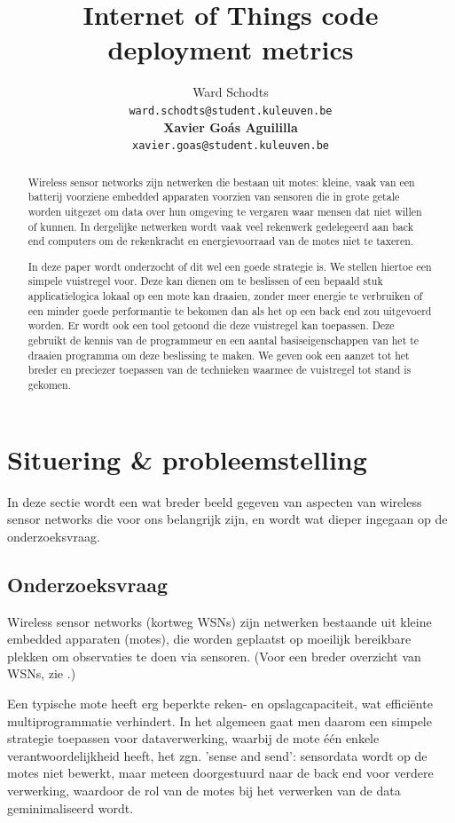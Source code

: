 \documentclass[11pt]{article}
\title{Internet of Things code deployment metrics}
\author{
  Ward Schodts\\
  \texttt{ward.schodts@student.kuleuven.be}
  \\[3ex]
  \textbf{Xavier Go\'as Aguililla}\\
  \texttt{xavier.goas@student.kuleuven.be}
}
\begin{document}
\maketitle

\listoftodos
\begin{abstract}
Wireless sensor networks zijn netwerken die bestaan uit motes: kleine, vaak van
een batterij voorziene embedded apparaten voorzien van sensoren die in grote
getale worden uitgezet om data over hun omgeving te vergaren waar mensen dat
niet willen of kunnen. In dergelijke netwerken wordt vaak veel rekenwerk
gedelegeerd aan back end computers om de rekenkracht en energievoorraad van de
motes niet te taxeren. 

In deze paper wordt onderzocht of dit wel een goede strategie is. We stellen
hiertoe een simpele vuistregel voor. Deze kan dienen om te beslissen of een
bepaald stuk applicatielogica lokaal op een mote kan draaien, zonder meer
energie te verbruiken of een minder goede performantie te bekomen dan als het op een
back end zou uitgevoerd worden. Er wordt ook een tool getoond die deze vuistregel
kan toepassen. Deze gebruikt de kennis van de programmeur en een aantal
basiseigenschappen van het te draaien programma om deze beslissing te maken. We
geven ook een aanzet tot het breder en preciezer toepassen van de technieken
waarmee de vuistregel tot stand is gekomen.
  
\end{abstract}

\section{Situering \& probleemstelling}

In deze sectie wordt een wat breder beeld gegeven van aspecten van wireless
sensor networks die voor ons belangrijk zijn, en wordt wat dieper ingegaan op de
onderzoeksvraag.

\subsection{Onderzoeksvraag}

Wireless sensor networks (kortweg WSNs) zijn netwerken bestaande uit kleine
embedded apparaten (motes), die worden geplaatst op moeilijk bereikbare plekken
om observaties te doen via sensoren. (Voor een breder overzicht van
WSNs, zie \cite{akyildiz2002wireless}.)

Een typische mote heeft erg beperkte reken- en opslagcapaciteit, wat
effici\"ente multiprogrammatie verhindert. In het algemeen gaat men daarom een
simpele strategie toepassen voor dataverwerking, waarbij de mote \'e\'en enkele
verantwoordelijkheid heeft, het zgn. 'sense and send': sensordata wordt op de
motes niet bewerkt, maar meteen doorgestuurd naar de back end voor verdere
verwerking, waardoor de rol van de motes bij het verwerken van de data
geminimaliseerd wordt.
\end{document}
